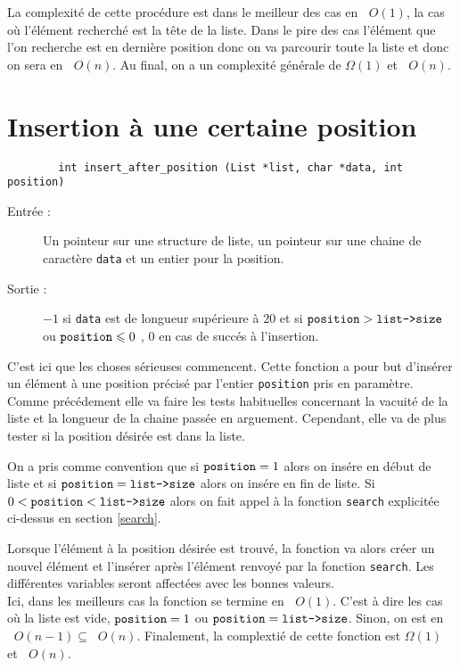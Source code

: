 \documentclass[a4paper, 12pt, leqno]{report}
\theoremstyle{plain}
\newcommand{\bigO}[1]{\ensuremath{\mathop{}\mathopen{}O\mathopen{}\left(#1\right)}}
\begin{document}
            La complexité de cette procédure est dans le meilleur des cas en $\bigO{1}$, la cas où l'élément recherché est la tête de la liste. Dans le pire des cas l'élément que l'on recherche est en dernière position donc on va parcourir toute la liste et donc on sera en $\bigO{n}$. Au final, on a un complexité générale de $\Omega(1)$ et $\bigO{n}$.
          

        \section{Insertion à une certaine position}
           \begin{verbatim}
        int insert_after_position (List *list, char *data, int position)
           \end{verbatim}
            \begin{description}
            \item[Entrée :] Un pointeur sur une structure de liste, un pointeur sur une chaine de caractère \verb+data+ et un entier pour la position.
            \item[Sortie :] $-1$ si \verb+data+ est de longueur supérieure à $20$ et si $\verb+position+ > \verb+list->size+$ ou $\verb+position+ \leqslant 0$ , $0$ en cas de succés à l'insertion.
            \end{description}
            C'est ici que les choses sérieuses commencent. Cette fonction a pour but d'insérer un élément à une position précisé par l'entier \verb+position+ pris en paramètre. Comme précédement elle va faire les tests habituelles concernant la vacuité de la liste et la longueur de la chaine passée en arguement. Cependant, elle va de plus tester si la position désirée est dans la liste.
            
            On a pris comme convention que si $\verb+position+ = 1$ alors on insére en début de liste et si $\verb+position+ = \verb+list->size+$ alors on insére en fin de liste. Si $0<\verb+position+<\verb+list->size+$ alors on fait appel à la fonction \verb+search+ explicitée ci-dessus en section \ref{search}. 
            
            Lorsque l'élément à la position désirée est trouvé, la fonction va alors créer un nouvel élément et l'insérer après l'élément renvoyé par la fonction \verb+search+. Les différentes variables seront affectées avec les bonnes valeurs.\\
            
            Ici, dans les meilleurs cas la fonction se termine en $\bigO{1}$. C'est à dire les cas où la liste est vide, $\verb+position+ = 1$ ou $\verb+position+=\verb+list->size+$. Sinon, on est en $\bigO{n-1} \subseteq \bigO{n}$. Finalement, la complextié de cette fonction est $\Omega(1)$ et $\bigO{n}$.
        
\end{document}
